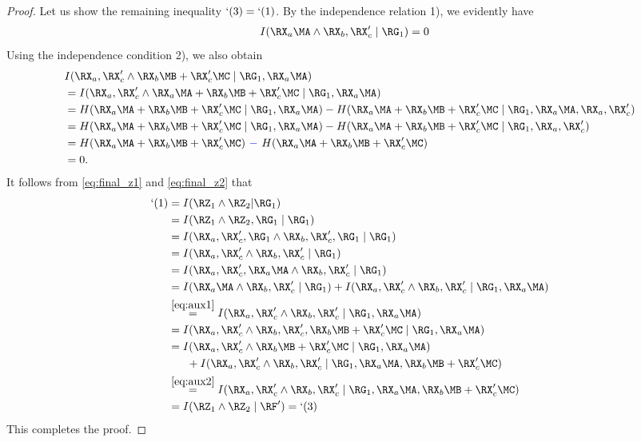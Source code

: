 \begin{proof}
Let us show the remaining inequality $`(3)=`(1)$. By the independence relation 1), we evidently have
\begin{align}
I(\RX_a\MA \wedge \RX_b, \RX'_c \mid \RG_1) &= 0 \label{eq:aux1}
\end{align}
Using the independence condition 2), we also obtain
\begin{align}
    &I(\RX_a, \RX'_c \wedge \RX_b \MB + \RX'_c \MC \mid \RG_1, \RX_a\MA) \notag\\ &=I(\RX_a, \RX'_c \wedge \RX_a\MA+\RX_b \MB + \RX'_c \MC \mid \RG_1, \RX_a\MA)\notag\\
    &=H(\RX_a\MA+\RX_b \MB + \RX'_c \MC \mid \RG_1, \RX_a\MA)%
    - H(\RX_a\MA+\RX_b \MB + \RX'_c \MC \mid \RG_1, \RX_a\MA,\RX_a, \RX'_c)\notag\\
    &=H(\RX_a\MA+\RX_b \MB + \RX'_c \MC \mid \RG_1, \RX_a\MA)%
    - H(\RX_a\MA+\RX_b \MB + \RX'_c \MC \mid \RG_1,\RX_a, \RX'_c)\notag\\
    &=H(\RX_a\MA+\RX_b \MB + \RX'_c \MC)%
    \ \textcolor{blue}{ - }\ H(\RX_a\MA+\RX_b \MB + \RX'_c \MC)\notag\\
    &=0.\label{eq:aux2}
\end{align}
It follows from \eqref{eq:final_z1} and \eqref{eq:final_z2} that
\begin{align*}
    `(1)&=I(\RZ_1\wedge \RZ_2|\RG_1)\\
        &=I(\RZ_1 \wedge \RZ_2, \RG_1 \mid \RG_1)\\
        &=I(\RX_a, \RX'_c, \RG_1 \wedge \RX_b, \RX'_c, \RG_1 \mid \RG_1)\\
        &=I(\RX_a, \RX'_c \wedge \RX_b, \RX'_c \mid \RG_1)\\
        &=I(\RX_a, \RX'_c, \RX_a\MA \wedge \RX_b, \RX'_c \mid \RG_1)\\
        &=I(\RX_a\MA \wedge \RX_b, \RX'_c \mid \RG_1)+I(\RX_a, \RX'_c \wedge \RX_b, \RX'_c \mid \RG_1, \RX_a\MA)\\
        &\stackrel{\eqref{eq:aux1}}{=}I(\RX_a, \RX'_c \wedge \RX_b, \RX'_c \mid \RG_1, \RX_a\MA)\\
        &=I(\RX_a, \RX'_c \wedge \RX_b, \RX'_c,\RX_b \MB + \RX'_c \MC \mid \RG_1, \RX_a\MA)\\
        &=I(\RX_a, \RX'_c \wedge \RX_b \MB + \RX'_c \MC \mid \RG_1, \RX_a\MA)\\
        &\mkern 30mu+I(\RX_a, \RX'_c \wedge \RX_b, \RX'_c\mid \RG_1, \RX_a\MA, \RX_b \MB + \RX'_c \MC)\\
        &\stackrel{\eqref{eq:aux2}}{=}I(\RX_a, \RX'_c \wedge \RX_b, \RX'_c \mid \RG_1, \RX_a\MA, \RX_b \MB + \RX'_c \MC)\\
        &=I(\RZ_1\wedge \RZ_2 \mid \RF')=`(3)
\end{align*}
 This completes the proof.

\end{proof}

